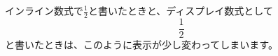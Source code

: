 \documentclass{ltjsarticle}
\begin{document}
インライン数式で$\frac{1}{2}$と書いたときと、ディスプレイ数式として
\[ \frac{1}{2} \]
と書いたときは、このように表示が少し変わってしまいます。
\end{document}
